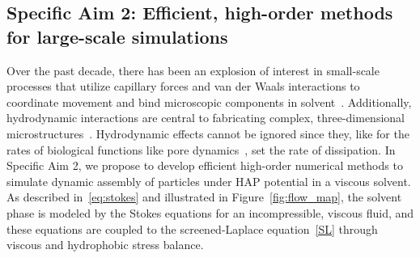 \subsection{Specific Aim 2: Efficient, high-order methods for large-scale simulations}
Over the past decade, there has been an explosion of interest in
small-scale processes that utilize capillary forces and van der Waals
interactions to coordinate movement
and bind microscopic components in solvent~\cite{Pandey2011, Zhang2017, Siontorou2017}.
Additionally, hydrodynamic interactions are central to fabricating complex,
three-dimensional microstructures~\cite{Dasgupta2017, Leong2007, Reynolds2019, Cho2010}.
Hydrodynamic effects cannot
be ignored since they, like for the rates of biological functions 
like pore dynamics~\cite{RYHAM20112929}, set the rate of dissipation.
%
In Specific Aim 2, we propose to develop efficient high-order numerical
methods to simulate dynamic assembly of particles under HAP potential in
a viscous solvent. 
%
%
%
%
%
As described in~\eqref{eq:stokes} and illustrated in
Figure~\ref{fig:flow_map}, the solvent phase is modeled by the Stokes
equations for an incompressible, viscous fluid, and these equations are
coupled to the screened-Laplace equation~\eqref{SL} through viscous and
hydrophobic stress balance. 
 


